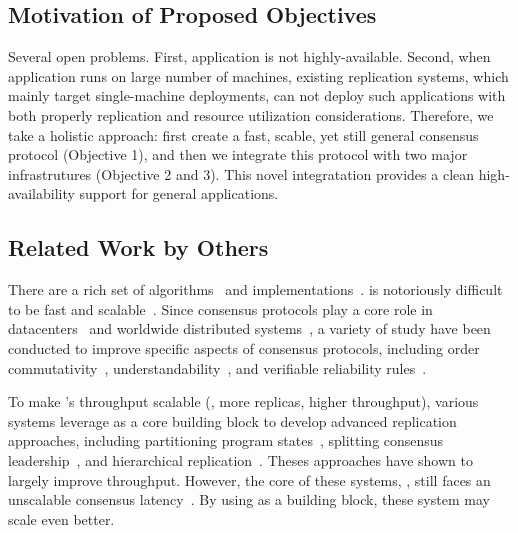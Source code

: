\vspace{-.15in}\subsection{Motivation of Proposed Objectives} 
\label{sec:motivation}\vspace{-.075in}

Several open problems. First, application is not highly-available. Second, when 
application runs on large number of machines, existing replication systems, 
which mainly target single-machine deployments, can not deploy such 
applications with both properly replication and resource utilization 
considerations. Therefore, we take a holistic approach: first create a fast, 
scable, yet still general consensus protocol (Objective 1), and then we 
integrate this protocol with two major infrastrutures (Objective 2 and 3). This 
novel integratation provides a clean high-availability support for general  
applications.

\vspace{-.15in}\subsection{Related Work by Others} 
 \label{sec:others-work}\vspace{-.075in} 
There are a rich set of
\paxos algorithms~\cite{paxos:practical,paxos,paxos:simple,paxos:complex,
epaxos:sosp13} and 
implementations~\cite{paxos:live,paxos:practical,chubby:osdi,crane:sosp15}. 
\paxos is notoriously difficult to be fast and 
scalable~\cite{ellis:thesis,manos:hotdep10,scatter:sosp11}. Since consensus 
protocols play a core role in datacenters~\cite{matei:hotcloud11, mesos:nsdi11, 
datacenter:os} and worldwide 
distributed systems~\cite{spanner:osdi12,mencius:osdi08}, a variety of study 
have been conducted to improve specific aspects of consensus protocols, 
including order commutativity~\cite{epaxos:sosp13}, 
understandability~\cite{raft:usenix14,paxos}, and verifiable reliability 
rules~\cite{modist:nsdi09,demeter:sosp11}.

To make \paxos's throughput scalable (\ie, more replicas, higher throughput), 
various systems leverage \paxos as a core building block to develop advanced 
replication approaches, including partitioning program 
states~\cite{scatter:sosp11,ssmr:dsn14}, splitting consensus 
leadership~\cite{mencius:osdi08,spaxos:srds12}, and hierarchical 
replication~\cite{manos:hotdep10,scatter:sosp11}. Theses approaches have shown 
to largely improve throughput. However, the core of these systems, 
\paxos, still faces an unscalable consensus 
latency~\cite{ellis:thesis,scatter:sosp11,manos:hotdep10}. By using \xxx as a 
building block, these system may scale even better.


